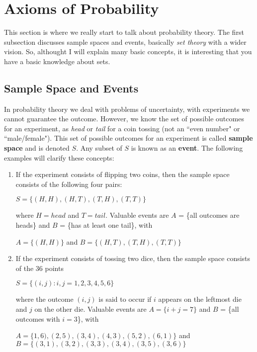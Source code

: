\documentclass[a4paper,twocolumn]{article}
\begin{document}
\section{Axioms of Probability}
\label{sec:axioms}

This section is where we really start to talk about probability theory. The first subsection discusses sample spaces and events, basically \textit{set theory} with a wider vision. So, althought I will explain many basic concepts, it is interesting that you have a basic knowledge about sets.

\subsection{Sample Space and Events}
\label{subsec:sample}

In probability theory we deal with problems of uncertainty, with experiments we cannot guarantee the outcome. However, we know the set of possible outcomes for an experiment, as \textit{head} or \textit{tail} for a coin tossing (not an ``even number" or ``male/female"). This set of possible outcomes for an experiment is called \textbf{sample space} and is denoted $S$. Any subset of $S$ is known as an \textbf{event}. The following examples will clarify these concepts:

\begin{enumerate}
    \item If the experiment consists of flipping two coins, then the sample space consists of the following four pairs:
    \begin{center}
    $S = \{(H,H),(H,T),(T,H),(T,T)\}$
    \end{center}
    where $H = head$ and $T = tail$. Valuable events are $A$ = \{all outcomes are heads\} and $B$ = \{has at least one tail\}, with
    \begin{center}
    $A = \{(H,H)\}$ and $B = \{(H,T),(T,H),(T,T)\}$
    \end{center}

    \item If the experiment consists of tossing two dice, then the sample space consists of the 36 points
    \begin{center}
    $S = \{(i, j): i, j = 1, 2, 3, 4, 5, 6\}$
    \end{center}
    where the outcome $(i, j)$ is said to occur if $i$ appears on the leftmost die and $j$ on the other die. Valuable events are $A = \{i + j = 7\}$ and $B$ = \{all outcomes with $i = 3$\}, with
    \begin{center}
    $A = \{1,6),(2,5),(3,4),(4,3),(5,2),(6,1)\}$ and $B = \{(3,1),(3,2),(3,3),(3,4),(3,5),(3,6)\}$
    \end{center}
\end{enumerate}
\end{document}
